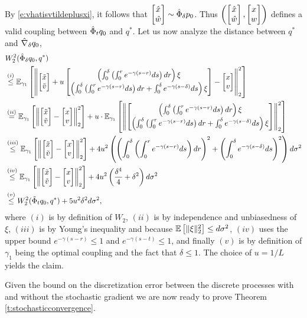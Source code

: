 \begin{Proof}
By \eqref{e:vhatisvtildeplusxi}, it follows that $\begin{bmatrix} \hat{x}\\\hat{w}\end{bmatrix}\sim \hat{\Phi}_\delta p_0$. Thus $\left(\begin{bmatrix} \hat{x}\\\hat{w}\end{bmatrix},\begin{bmatrix} x\\w\end{bmatrix}\right)$ defines a valid coupling between $\hat{\Phi}_t q_0$ and $q^*$. Let us now analyze the distance between $q^*$ and $\hat{\nabla}_{\delta} q_0$,
\begin{align*}
& W_2^2(\hat{\Phi}_\delta q_0, q^*)\\
& \overset{(i)}{\leq}  \mathbb{E}_{\gamma_1}\left[\left\|\begin{bmatrix} \tilde{x}\\\tilde{v}\end{bmatrix} + u\begin{bmatrix} \left(\int_0^\delta \left(\int_0^r e^{-\gamma(s-r)} ds\right) dr\right)\xi\\\left(\int_0^\delta \left(\int_0^r e^{-\gamma(s-r)} ds\right) dr + \int_0^\delta e^{-\gamma(s-\delta)} ds\right) \xi\end{bmatrix} - \begin{bmatrix} x\\v\end{bmatrix}\right\|_2^2\right]\\
& \overset{(ii)}{=} \mathbb{E}_{\gamma_1}\left[\left\|\begin{bmatrix} \tilde{x}\\\tilde{v}\end{bmatrix}- \begin{bmatrix} x\\v\end{bmatrix}\right\|_2^2\right] + u\cdot\mathbb{E}_{\gamma_1}\left[\left\|\begin{bmatrix} \left(\int_0^\delta \left(\int_0^r e^{-\gamma(s-r)} ds\right) dr\right)\xi\\\left(\int_0^\delta \left(\int_0^r e^{-\gamma(s-r)} ds\right) dr + \int_0^\delta e^{-\gamma(s-\delta)} ds\right) \xi\end{bmatrix}\right\|_2^2\right]\\
& \overset{(iii)}{\leq}  \mathbb{E}_{\gamma_1}\left[\left\|\begin{bmatrix} \tilde{x}\\\tilde{v}\end{bmatrix}- \begin{bmatrix} x\\v\end{bmatrix}\right\|_2^2\right] + 4u^2\left(\left(\int_0^\delta \left(\int_0^r e^{-\gamma(s-r)} ds\right) dr\right)^2 + \left(\int_0^\delta e^{-\gamma(s-\delta)} ds\right)^2\right)d\sigma^2\\
& \overset{(iv)}{\leq}  \mathbb{E}_{\gamma_1}\left[\left\|\begin{bmatrix} \tilde{x}\\\tilde{v}\end{bmatrix}- \begin{bmatrix} x\\v\end{bmatrix}\right\|_2^2\right] + 4u^2\left(\frac{\delta^4}{4} + \delta^2\right)d\sigma^2\\
& \overset{(v)}{\leq} W_2^2(\tilde{\Phi}_t q_0, q^*) + 5u^2\delta^2d\sigma^2,
\end{align*}
where $(i)$ is by definition of $W_2$, $(ii)$ is by independence and unbiasedness of $\xi$, $(iii)$  is by Young's inequality and because $\mathbb{E}\left[\|\xi\|_2^2\right]\leq d\sigma^2$, $(iv)$ uses the upper bound $e^{-\gamma(s-r)}\leq 1$ and $e^{-\gamma(s-t)}\leq 1$, and finally $(v)$ is by definition of $\gamma_1$ being the optimal coupling and the fact that $\delta\leq 1$. The choice of $u=1/L$ yields the claim.

\end{Proof}
Given the bound on the discretization error between the discrete processes with and without the stochastic gradient we are now ready to prove Theorem \ref{t:stochasticconvergence}.
